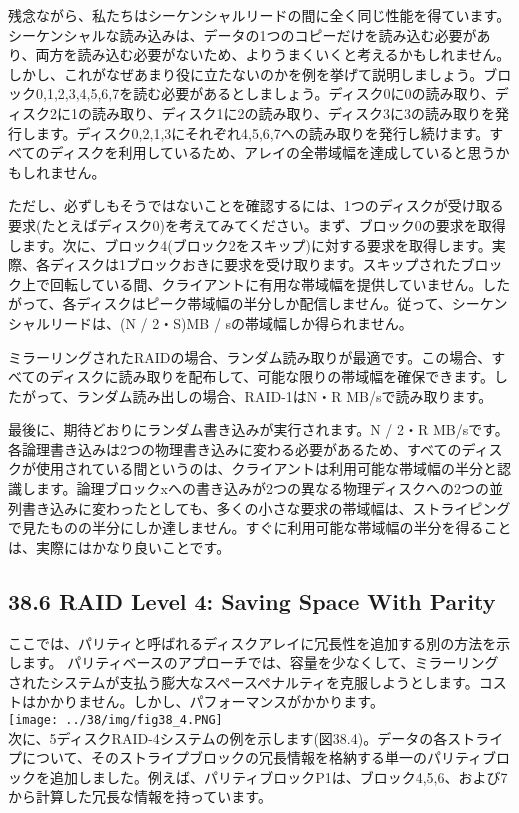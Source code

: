残念ながら、私たちはシーケンシャルリードの間に全く同じ性能を得ています。シーケンシャルな読み込みは、データの1つのコピーだけを読み込む必要があり、両方を読み込む必要がないため、よりうまくいくと考えるかもしれません。しかし、これがなぜあまり役に立たないのかを例を挙げて説明しましょう。ブロック0,1,2,3,4,5,6,7を読む必要があるとしましょう。ディスク0に0の読み取り、ディスク2に1の読み取り、ディスク1に2の読み取り、ディスク3に3の読み取りを発行します。ディスク0,2,1,3にそれぞれ4,5,6,7への読み取りを発行し続けます。すべてのディスクを利用しているため、アレイの全帯域幅を達成していると思うかもしれません。

ただし、必ずしもそうではないことを確認するには、1つのディスクが受け取る要求(たとえばディスク0)を考えてみてください。まず、ブロック0の要求を取得します。次に、ブロック4(ブロック2をスキップ)に対する要求を取得します。実際、各ディスクは1ブロックおきに要求を受け取ります。スキップされたブロック上で回転している間、クライアントに有用な帯域幅を提供していません。したがって、各ディスクはピーク帯域幅の半分しか配信しません。従って、シーケンシャルリードは、(N
/ 2・S)MB / sの帯域幅しか得られません。

ミラーリングされたRAIDの場合、ランダム読み取りが最適です。この場合、すべてのディスクに読み取りを配布して、可能な限りの帯域幅を確保できます。したがって、ランダム読み出しの場合、RAID-1はN・R
MB/sで読み取ります。

最後に、期待どおりにランダム書き込みが実行されます。N / 2・R
MB/sです。各論理書き込みは2つの物理書き込みに変わる必要があるため、すべてのディスクが使用されている間というのは、クライアントは利用可能な帯域幅の半分と認識します。論理ブロックxへの書き込みが2つの異なる物理ディスクへの2つの並列書き込みに変わったとしても、多くの小さな要求の帯域幅は、ストライピングで見たものの半分にしか達しません。すぐに利用可能な帯域幅の半分を得ることは、実際にはかなり良いことです。

\hypertarget{raid-level-4-saving-space-with-parity}{%
\subsection*{38.6 RAID Level 4: Saving Space With
Parity}\label{raid-level-4-saving-space-with-parity}}

ここでは、パリティと呼ばれるディスクアレイに冗長性を追加する別の方法を示します。
パリティベースのアプローチでは、容量を少なくして、ミラーリングされたシステムが支払う膨大なスペースペナルティを克服しようとします。コストはかかりません。しかし、パフォーマンスがかかります。\\
\texttt{[image: ../38/img/fig38\_4.PNG]}\\
次に、5ディスクRAID-4システムの例を示します(図38.4)。データの各ストライプについて、そのストライプブロックの冗長情報を格納する単一のパリティブロックを追加しました。例えば、パリティブロックP1は、ブロック4,5,6、および7から計算した冗長な情報を持っています。

